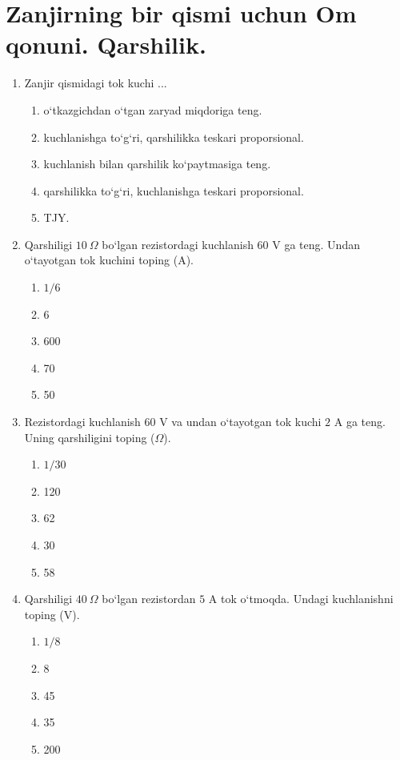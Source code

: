 \section{Zanjirning bir qismi uchun Om qonuni. Qarshilik.}


\begin{enumerate}

\item Zanjir qismidagi tok kuchi ...
\begin{enumerate}[label=\Alph*)]
\item o‘tkazgichdan o‘tgan zaryad miqdoriga teng.
\item kuchlanishga to‘g‘ri, qarshilikka teskari proporsional.
\item kuchlanish bilan qarshilik ko‘paytmasiga teng.
\item qarshilikka to‘g‘ri, kuchlanishga teskari proporsional.
\item TJY.
\end{enumerate}

\item Qarshiligi $10~\Omega$ bo‘lgan rezistordagi kuchlanish $60$ V ga teng. Undan o‘tayotgan tok kuchini toping (A).
\begin{enumerate}[label=\Alph*)]
\item $1/6$
\item 6
\item 600
\item 70
\item 50
\end{enumerate}

\item Rezistordagi kuchlanish $60$ V va undan o‘tayotgan tok kuchi $2$ A ga teng. Uning qarshiligini toping ($\Omega$).
\begin{enumerate}[label=\Alph*)]
\item $1/30$
\item 120
\item 62
\item 30
\item 58
\end{enumerate}

\item Qarshiligi $40~\Omega$ bo‘lgan rezistordan $5$ A tok o‘tmoqda. Undagi kuchlanishni toping (V).
\begin{enumerate}[label=\Alph*)]
\item $1/8$
\item 8
\item 45
\item 35
\item 200
\end{enumerate}


\end{enumerate}

